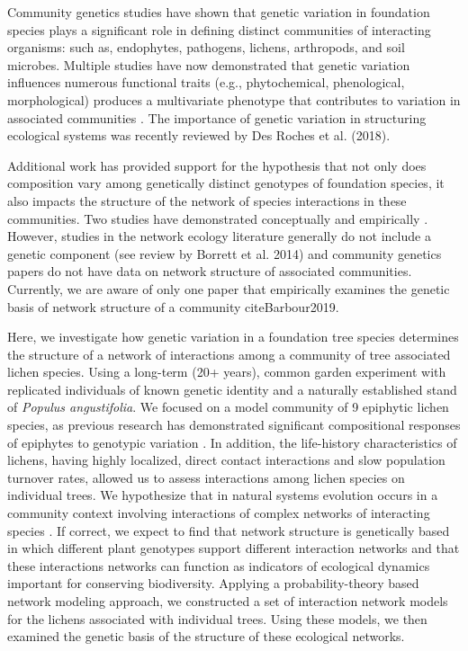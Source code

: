 \documentclass[11pt,twocolumn,twoside,lineno]{pnas-new}
\begin{document}
Community genetics studies \cite{Lamit2015a} have shown that genetic
variation in foundation species \cite{Ellison2005} plays a significant
role in defining distinct communities of interacting organisms:  such
as, endophytes, pathogens, lichens, arthropods, and soil
microbes. Multiple studies have now demonstrated that genetic
variation influences numerous functional traits (e.g., phytochemical,
phenological, morphological) produces a multivariate phenotype
\cite{holeski2012} that contributes to variation in associated
communities \cite{Bailey2009a}. The importance of genetic variation in
structuring ecological systems was recently reviewed by Des Roches et
al. (2018). 

Additional work has provided support for the hypothesis that not only
does composition vary among genetically distinct genotypes of
foundation species, it also impacts the structure of the network of
species interactions in these communities. Two studies have
demonstrated conceptually \cite{Lau2015a} and empirically
\cite{Keith2017}. However, studies in the network ecology literature
generally do not include a genetic component (see review by Borrett et
al. 2014) and community genetics papers do not have data on network
structure of associated communities. Currently, we are aware of only
one paper that empirically examines the genetic basis of network
structure of a community cite{Barbour2019}.


Here, we investigate how genetic variation in a foundation tree
species determines the structure of a network of interactions among a
community of tree associated lichen species. Using a long-term (20+
years), common garden experiment with replicated individuals of known
genetic identity and a naturally established stand of \textit{Populus
  angustifolia}. We focused on a model community of 9 epiphytic lichen
species, as previous research has demonstrated significant
compositional responses of epiphytes to genotypic variation
\cite{Winfree2011, Zytynska2011}. In addition, the life-history
characteristics of lichens, having highly localized, direct contact
interactions and slow population turnover rates, allowed us to assess
interactions among lichen species on individual trees. We hypothesize
that in natural systems evolution occurs in a community context
involving interactions of complex networks of interacting species
\cite{Lau2015a, Keith2017, Thompson2013, Bascompte2006}.  If correct,
we expect to find that network structure is genetically based in which
different plant genotypes support different interaction networks and
that these interactions networks can function as indicators of
ecological dynamics important for conserving biodiversity.  Applying a
probability-theory based network modeling approach, we constructed a
set of interaction network models for the lichens associated with
individual trees. Using these models, we then examined the genetic
basis of the structure of these ecological networks.
\end{document}
